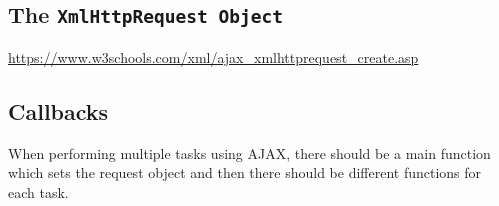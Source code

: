 	\subsection{The \texttt{XmlHttpRequest Object}}

		\url{https://www.w3schools.com/xml/ajax_xmlhttprequest_create.asp}


	\subsection{Callbacks}

		\par{When performing multiple tasks using AJAX, there should be a main function which sets the request object and then there should be different  functions for each task.}


		





